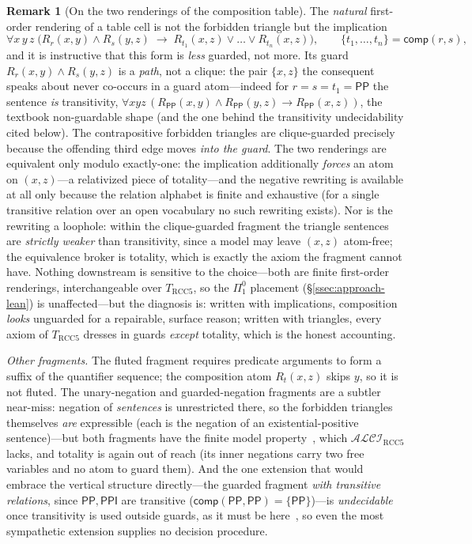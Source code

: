 \documentclass[11pt]{article}
\newcommand{\ALCIRCC}[1]{\mathcal{ALCI}_{\mathrm{RCC#1}}}
\newcommand{\PP}{\mathsf{PP}}
\newcommand{\PPI}{\mathsf{PPI}}
\newcommand{\comp}{\ensuremath{\mathsf{comp}}}
\theoremstyle{plain}
\theoremstyle{definition}
\newtheorem{remark}[theorem]{Remark}
\begin{document}
\begin{remark}[On the two renderings of the composition table]
\label{rem:renderings}
The \emph{natural} first-order rendering of a table cell is not the
forbidden triangle but the implication
\[
\forall x\,y\,z\;\bigl(R_r(x,y)\wedge R_s(y,z)\;\rightarrow\;
R_{t_1}(x,z)\vee\dots\vee R_{t_n}(x,z)\bigr),
\qquad \{t_1,\dots,t_n\}=\comp(r,s),
\]
and it is instructive that this form is \emph{less} guarded, not more. Its
guard $R_r(x,y)\wedge R_s(y,z)$ is a \emph{path}, not a clique: the pair
$\{x,z\}$ the consequent speaks about never co-occurs in a guard
atom---indeed for $r=s=t_1=\PP$ the sentence \emph{is} transitivity,
$\forall xyz\,(R_\PP(x,y)\wedge R_\PP(y,z)\rightarrow R_\PP(x,z))$, the
textbook non-guardable shape (and the one behind the transitivity
undecidability cited below). The contrapositive forbidden triangles are
clique-guarded precisely because the offending third edge moves \emph{into
the guard}. The two renderings are equivalent only modulo
exactly-one: the implication additionally \emph{forces} an atom on
$(x,z)$---a relativized piece of totality---and the negative rewriting is
available at all only because the relation alphabet is finite and
exhaustive (for a single transitive relation over an open vocabulary no
such rewriting exists). Nor is the rewriting a loophole: within the
clique-guarded fragment the triangle sentences are \emph{strictly weaker}
than transitivity, since a model may leave $(x,z)$ atom-free; the
equivalence broker is totality, which is exactly the axiom the fragment
cannot have. Nothing downstream is sensitive to the choice---both are
finite first-order renderings, interchangeable over $T_{\mathrm{RCC5}}$,
so the $\Pi^0_1$ placement (\S\ref{ssec:approach-lean}) is
unaffected---but the diagnosis is: written with implications, composition \emph{looks}
unguarded for a repairable, surface reason; written with triangles, every
axiom of $T_{\mathrm{RCC5}}$ dresses in guards \emph{except} totality,
which is the honest accounting.
\end{remark}

\emph{Other fragments.} The fluted fragment requires predicate arguments to
form a suffix of the quantifier sequence; the composition atom $R_t(x,z)$
skips $y$, so it is not fluted. The unary-negation and guarded-negation
fragments are a subtler near-miss: negation of \emph{sentences} is
unrestricted there, so the forbidden triangles themselves \emph{are}
expressible (each is the negation of an existential-positive
sentence)---but both fragments have the finite model
property~\cite{BaranyTenCateSegoufin2015}, which $\ALCIRCC5$ lacks, and
totality is again out of reach (its inner negations carry two free
variables and no atom to guard them). And the one extension that would embrace the
vertical structure directly---the guarded fragment \emph{with transitive
relations}, since $\PP,\PPI$ are transitive ($\comp(\PP,\PP)=\{\PP\}$)---is
\emph{undecidable} once transitivity is used outside guards, as it must be
here~\cite{GanzingerMeyerVeanes1999}, so even the most sympathetic extension
supplies no decision procedure.
\end{document}
